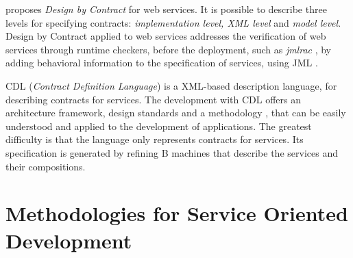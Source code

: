 \cite{HL05TACoS} proposes \textit{Design by Contract} for web services. It is
possible to describe three levels for specifying contracts: \textit{implementation level,
XML level} and \textit{model level}. Design by Contract applied to web services
addresses the verification of web services through runtime checkers,
before the deployment, such as \textit{jmlrac} \cite{LeavensCCRC02}, by adding behavioral
information to the specification of services, using JML \cite{LeavensCCRC02}.

CDL (\textit{Contract Definition Language}) \cite{cdl2006} is a XML-based
description language, for describing contracts for services. The
development with CDL offers an architecture framework, design standards and a
methodology \cite{MilanovicM05,Milanovic05,Milanovic06,MilanovicM06}, that can
be easily understood and applied to the development of applications. The
greatest difficulty is that the language only
represents contracts for services. Its specification is generated by
refining B \cite{AbrialLNSS91} machines that describe
the services and their compositions. 

% 



\section{Methodologies for Service Oriented Development}
\label{sec:metodologies}


